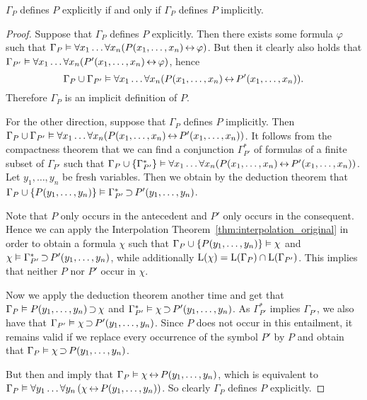 \begin{thm}
	\label{thm:beth}
	$\Gamma_P$ defines $P$ explicitly if and only if $\Gamma_P$ defines $P$ implicitly.
\end{thm}
\begin{proof}
	Suppose that $\Gamma_P$ defines $P$ explicitly. 
	Then there exists some formula $\varphi$ such that 
	$\Gamma_P\vDash \forall x_1\dots \forall x_n (  P(x_1, \dots, x_n) \operatorname{\leftrightarrow} \varphi)$.
	But then it clearly also holds that 
	$\Gamma_{P'}\vDash \forall x_1\dots \forall x_n (  P'(x_1, \dots, x_n) \operatorname{\leftrightarrow} \varphi)$,
	hence
	\[
	\Gamma_{P} \cup \Gamma_{P'} \vDash \forall x_1\dots \forall x_n (P(x_1, \dots, x_n) \operatorname{\leftrightarrow} P'(x_1, \dots, x_n)).\]
	Therefore $\Gamma_P$ is an implicit definition of $P$.

	For the other direction, suppose that $\Gamma_P$ defines $P$ implicitly. 
	Then
	$\Gamma_P \cup \Gamma_{P'} \vDash\allowbreak \forall x_1\dots \forall x_n (  P(x_1, \dots, x_n) \operatorname{\leftrightarrow} P'(x_1, \dots, x_n))$.
	It follows from the compactness theorem that
	we can find a conjunction $\Gamma^*_{P'}$ of formulas of a finite subset of $\Gamma_{P'}$ such that  
	$\Gamma_P \cup \{\Gamma^*_{P'}\} \vDash \forall x_1\dots \forall x_n (  P(x_1, \dots, x_n) \operatorname{\leftrightarrow} P'(x_1, \dots, x_n))$.
	Let $y_1, \dots, y_n$ be fresh variables.
	Then we obtain by the deduction theorem that  
	$\Gamma_P \cup \{P(y_1, \dots, y_n)\} \vDash \Gamma^*_{P'} \operatorname{\supset}  P'(y_1, \dots, y_n)$.

	Note that $P$ only occurs in the antecedent and $P'$ only occurs in the consequent.
	Hence we can apply the Interpolation Theorem~\ref{thm:interpolation_original} in order to obtain a formula $\chi$
	such that
	$\Gamma_P \cup \{P(y_1, \dots, y_n)\} \vDash \chi$ and
	$\chi \vDash \Gamma^*_{P'} \operatorname{\supset}  P'(y_1, \dots, y_n)$,
	while additionally $\operatorname{L}(\chi) = \operatorname{L}(\Gamma_P) \cap \operatorname{L}(\Gamma_{P'})$. This implies that neither $P$ nor $P'$ occur in\nolinebreak{} $\chi$.

	Now we apply the deduction theorem another time and get that
	\markA{} $\Gamma_P \vDash P(y_1, \dots, y_n) \operatorname{\supset} \chi$ and
	$\Gamma^*_{P'} \vDash \chi \operatorname{\supset}  P'(y_1, \dots, y_n)$.
	As $\Gamma^*_{P'}$ implies $\Gamma_{P'}$, we also have that
	$\Gamma_{P'} \vDash \chi \operatorname{\supset}  P'(y_1, \dots, y_n)$.
	Since $P$ does not occur in this entailment, it remains valid if we replace every occurrence of the symbol $P'$ by $P$
	and obtain that
	\markB{} $\Gamma_{P} \vDash \chi \operatorname{\supset}  P(y_1, \dots, y_n)$.

	But then \markA{} and \markB{} imply that 
	$\Gamma_{P} \vDash \chi \operatorname{\leftrightarrow}  P(y_1, \dots, y_n)$, which is equivalent to
	$\Gamma_{P} \vDash \forall y_1\dots\forall y_n \left( \chi \operatorname{\leftrightarrow}  P(y_1, \dots, y_n)\right)$.
	So clearly $\Gamma_P$ defines $P$ explicitly.
\end{proof}

